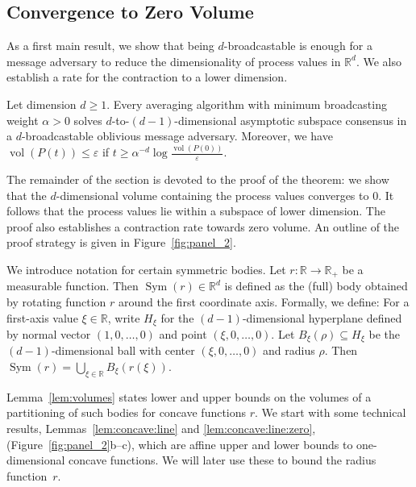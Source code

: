 \documentclass[a4paper,USenglish]{lipics-v2021}
\DeclareMathOperator{\vol}{vol}
\DeclareMathOperator{\Sym}{Sym}
\newcommand{\IR}{\mathbb{R}}
\newcommand{\Ball}{B}
\renewcommand{\leq}{\leqslant}
\renewcommand{\geq}{\geqslant}
\begin{document}
\subsection{Convergence to Zero Volume}
\label{sec:converge_zero_vol}

As a first main result, we show that being $d$-broadcastable is enough for a message adversary to reduce the dimensionality of process values in $\IR^d$.
We also establish a rate for the contraction to a lower dimension.

\begin{theorem}\label{thm:poss}
	Let dimension $d \geq 1$.
	Every averaging algorithm with minimum broadcasting weight $\alpha > 0$ solves $d$-to-$(d-1)$-dimensional asymptotic subspace consensus in a $d$-broadcastable oblivious message adversary.
	Moreover, we have $\vol(P(t)) \leq \varepsilon$ if $t \geq \alpha^{-d} \log \frac{\vol(P(0))}{\varepsilon}$.
\end{theorem}

The remainder of the section is devoted to the proof of the theorem: we show that the $d$-dimensional volume containing the process values converges to $0$.
It follows that the process values lie within a subspace of lower dimension.
The proof also establishes a contraction rate towards zero volume.
An outline of the proof strategy is given in Figure~\ref{fig:panel_2}.

We introduce notation for certain symmetric bodies.
Let $r:\IR \to \IR_+$ be a measurable function.
Then $\Sym(r) \in \IR^d$ is defined as the (full) body obtained by rotating
function $r$ around the first coordinate axis.
Formally, we define:
For a first-axis value $\xi \in \IR$,
write $H_\xi$ for the $(d-1)$-dimensional hyperplane defined by normal vector $(1,0,\dots,0)$ and point $(\xi,0,\dots,0)$.
Let $\Ball_\xi(\rho) \subseteq H_\xi$ be the $(d-1)$-dimensional ball with center $(\xi, 0, \dots, 0)$ and radius $\rho$.
Then $\Sym(r) = \bigcup_{\xi \in \IR}\Ball_\xi(r(\xi))$.

Lemma~\ref{lem:volumes} states lower and upper bounds on the volumes of a partitioning
of such bodies for concave functions $r$.
We start with some technical results, Lemmas~\ref{lem:concave:line} and \ref{lem:concave:line:zero}, (Figure~\ref{fig:panel_2}b--c), which are affine upper and lower bounds to one-dimensional concave functions.
We will later use these to bound the radius function~$r$.
\end{document}
